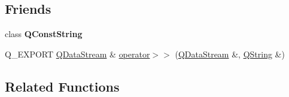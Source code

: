 \subsection*{Friends}
\begin{DoxyCompactItemize}
\item 
\mbox{\label{class_q_string_aff7e2646af69210685c894cbc1646332}} 
class {\bfseries Q\+Const\+String}
\item 
Q\+\_\+\+E\+X\+P\+O\+RT \mbox{\hyperlink{class_q_data_stream}{Q\+Data\+Stream}} \& \mbox{\hyperlink{class_q_string_ae8d642385fbe1a96358fe7432baf546b}{operator$>$$>$}} (\mbox{\hyperlink{class_q_data_stream}{Q\+Data\+Stream}} \&, \mbox{\hyperlink{class_q_string}{Q\+String}} \&)
\end{DoxyCompactItemize}
\subsection*{Related Functions}
